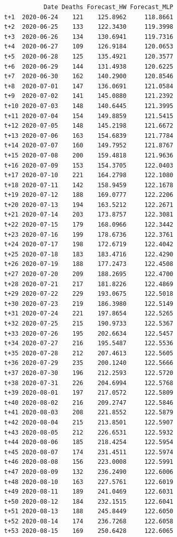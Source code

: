 \documentclass[
  us-letterpaper,
]{scrreprt}
\theoremstyle{definition}
\theoremstyle{plain}
\theoremstyle{plain}
\theoremstyle{definition}
\theoremstyle{remark}
\begin{document}
\begin{table}
{\begin{verbatim}
           Date Deaths Forecast_HW Forecast_MLP
t+1  2020-06-24    121    125.8962     118.8661
t+2  2020-06-25    133    122.3430     119.3998
t+3  2020-06-26    134    130.6941     119.7316
t+4  2020-06-27    109    126.9184     120.0653
t+5  2020-06-28    125    135.4921     120.3577
t+6  2020-06-29    144    131.4938     120.6225
t+7  2020-06-30    162    140.2900     120.8546
t+8  2020-07-01    147    136.0691     121.0584
t+9  2020-07-02    141    145.0880     121.2392
t+10 2020-07-03    148    140.6445     121.3995
t+11 2020-07-04    154    149.8859     121.5415
t+12 2020-07-05    148    145.2198     121.6672
t+13 2020-07-06    163    154.6839     121.7784
t+14 2020-07-07    160    149.7952     121.8767
t+15 2020-07-08    200    159.4818     121.9636
t+16 2020-07-09    153    154.3705     122.0403
t+17 2020-07-10    221    164.2798     122.1080
t+18 2020-07-11    142    158.9459     122.1678
t+19 2020-07-12    188    169.0777     122.2206
t+20 2020-07-13    194    163.5212     122.2671
t+21 2020-07-14    203    173.8757     122.3081
t+22 2020-07-15    179    168.0966     122.3442
t+23 2020-07-16    199    178.6736     122.3761
t+24 2020-07-17    198    172.6719     122.4042
t+25 2020-07-18    183    183.4716     122.4290
t+26 2020-07-19    188    177.2473     122.4508
t+27 2020-07-20    209    188.2695     122.4700
t+28 2020-07-21    217    181.8226     122.4869
t+29 2020-07-22    229    193.0675     122.5018
t+30 2020-07-23    219    186.3980     122.5149
t+31 2020-07-24    221    197.8654     122.5265
t+32 2020-07-25    215    190.9733     122.5367
t+33 2020-07-26    195    202.6634     122.5457
t+34 2020-07-27    216    195.5487     122.5536
t+35 2020-07-28    212    207.4613     122.5605
t+36 2020-07-29    235    200.1240     122.5666
t+37 2020-07-30    196    212.2593     122.5720
t+38 2020-07-31    226    204.6994     122.5768
t+39 2020-08-01    197    217.0572     122.5809
t+40 2020-08-02    216    209.2747     122.5846
t+41 2020-08-03    208    221.8552     122.5879
t+42 2020-08-04    215    213.8501     122.5907
t+43 2020-08-05    212    226.6531     122.5932
t+44 2020-08-06    185    218.4254     122.5954
t+45 2020-08-07    174    231.4511     122.5974
t+46 2020-08-08    156    223.0008     122.5991
t+47 2020-08-09    132    236.2490     122.6006
t+48 2020-08-10    163    227.5761     122.6019
t+49 2020-08-11    189    241.0469     122.6031
t+50 2020-08-12    184    232.1515     122.6041
t+51 2020-08-13    188    245.8449     122.6050
t+52 2020-08-14    174    236.7268     122.6058
t+53 2020-08-15    169    250.6428     122.6065
\end{verbatim}

}

\end{table}%
\end{document}
